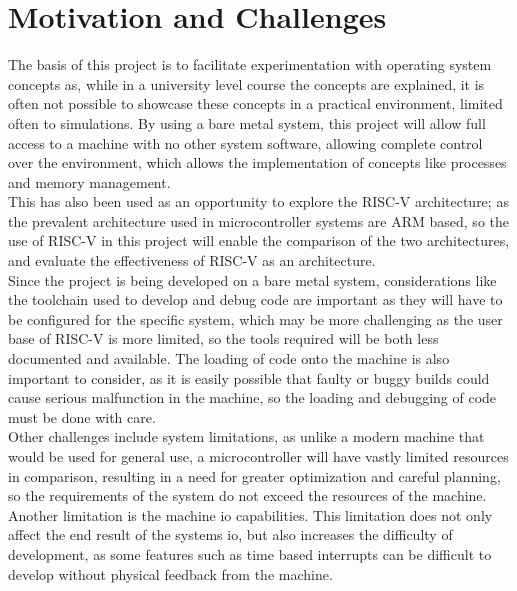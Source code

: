 \section{Motivation and Challenges}
The basis of this project is to facilitate experimentation with operating system concepts as, while in a university level course the concepts are explained, it is often not possible to showcase these concepts in a practical environment, limited often to simulations. By using a bare metal system, this project will allow full access to a machine with no other system software, allowing complete control over the environment, which allows the implementation of concepts like processes and memory management. \\
This has also been used as an opportunity to explore the RISC-V architecture; as the prevalent architecture used in microcontroller systems are ARM based, so the use of RISC-V in this project will enable the comparison of the two architectures, and evaluate the effectiveness of RISC-V as an architecture.\\
Since the project is being developed on a bare metal system, considerations like the toolchain used to develop and debug code are important as they will have to be configured for the specific system, which may be more challenging as the user base of RISC-V is more limited, so the tools required will be both less documented and available. The loading of code onto the machine is also important to consider, as it is easily possible that faulty or buggy builds could cause serious malfunction in the machine, so the loading and debugging of code must be done with care.\\
Other challenges include system limitations, as unlike a modern machine that would be used for general use, a microcontroller will have vastly limited resources in comparison, resulting in a need for greater optimization and careful planning, so the requirements of the system do not exceed the resources of the machine. Another limitation is the machine \ac{io} capabilities. This limitation does not only affect the end result of the systems \ac{io}, but also increases the difficulty of development, as some features such as time based interrupts can be difficult to develop without physical feedback from the machine.


